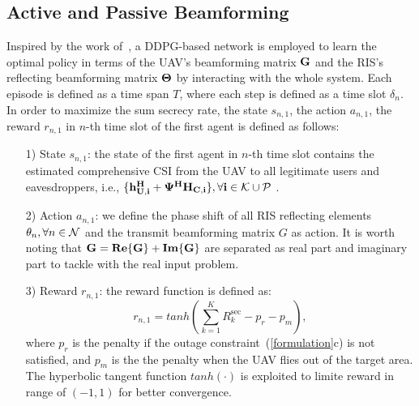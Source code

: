 \documentclass[journal]{IEEEtran}
\begin{document}
\subsection{Active and Passive Beamforming}
Inspired by the work of~\cite{secure-1}, a DDPG-based network is employed to learn the optimal policy in terms of the UAV's beamforming matrix $\bf{G}$ and the RIS's reflecting beamforming matrix $\bf{\Theta}$ by interacting with the whole system. Each episode is defined as a time span $T$, where each step is defined as a time slot $\delta_n$. In order to maximize the sum secrecy rate, the state $s_{n,1}$, the action $a_{n,1}$, the reward $r_{n,1}$ in $n$-th time slot of the first agent is defined as follows:
\begin{itemize}
  \item [1)] 
  State $s_{n,1}$: the state of the first agent in $n$-th time slot contains the estimated comprehensive CSI from the UAV to all legitimate users and eavesdroppers, i.e., $\{ \bf{h}_{U,i}^{H}+\bm{\Psi}^{H}\bf{H}_{C,i} \},\forall i \in {\cal K}\cup {\cal P} $ .
  \item [2)]
  Action $a_{n,1}$: we define the phase shift of all RIS reflecting elements $\theta_n, \forall n \in {\cal N}$ and the transmit beamforming matrix $G $ as action. It is worth noting that $\bf{G} = Re\{ \bf{G} \} + Im\{ \bf{G} \}$ are separated as real part and imaginary part to tackle with the real input problem.
  \item [3)]
  Reward $r_{n,1}$: the reward function is defined as:
  \begin{equation}\label{reward}
    r_{n,1}=tanh(\sum_{k=1}^{K}  R_{k}^{\mathrm{sec}}-p_{r}-p_{m}),
  \end{equation}
  where $p_{r}$ is the penalty if the outage constraint~(\ref{formulation}\rm{c}) is not satisfied, and $p_{m}$ is the the penalty when the UAV flies out of the target area. The hyperbolic tangent function $tanh(\cdot )$ is exploited to limite reward in range of $(-1,1)$ for better convergence.
\end{itemize}
\end{document}
